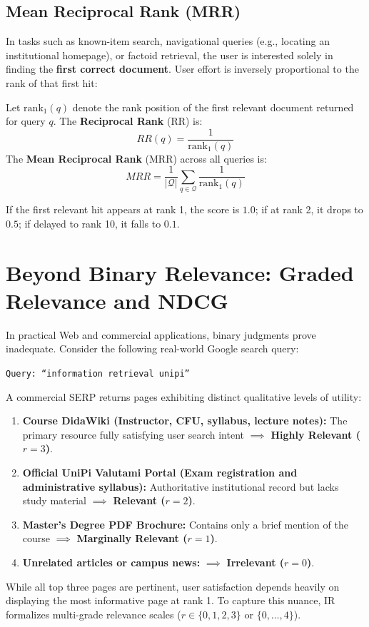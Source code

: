 \subsection{Mean Reciprocal Rank (MRR)}
In tasks such as known-item search, navigational queries (e.g., locating an institutional homepage), or factoid retrieval, the user is interested solely in finding the \textbf{first correct document}. User effort is inversely proportional to the rank of that first hit:

\begin{definition}
Let $\mathrm{rank}_1(q)$ denote the rank position of the first relevant document returned for query $q$. The \textbf{Reciprocal Rank} (RR) is:
\begin{equation}
RR(q) = \frac{1}{\mathrm{rank}_1(q)}
\end{equation}
The \textbf{Mean Reciprocal Rank} (MRR) across all queries is:
\begin{equation}
MRR = \frac{1}{|\mathcal{Q}|} \sum_{q \in \mathcal{Q}} \frac{1}{\mathrm{rank}_1(q)}
\end{equation}
\end{definition}
If the first relevant hit appears at rank 1, the score is $1.0$; if at rank 2, it drops to $0.5$; if delayed to rank 10, it falls to $0.1$.

\FloatBarrier
\section{Beyond Binary Relevance: Graded Relevance and NDCG}

In practical Web and commercial applications, binary judgments prove inadequate. Consider the following real-world Google search query:
\begin{center}
\texttt{Query: ``information retrieval unipi''}
\end{center}
A commercial SERP returns pages exhibiting distinct qualitative levels of utility:
\begin{enumerate}
    \item \textbf{Course DidaWiki (Instructor, CFU, syllabus, lecture notes):} The primary resource fully satisfying user search intent $\implies$ \textbf{Highly Relevant ($r = 3$)}.
    \item \textbf{Official UniPi Valutami Portal (Exam registration and administrative syllabus):} Authoritative institutional record but lacks study material $\implies$ \textbf{Relevant ($r = 2$)}.
    \item \textbf{Master's Degree PDF Brochure:} Contains only a brief mention of the course $\implies$ \textbf{Marginally Relevant ($r = 1$)}.
    \item \textbf{Unrelated articles or campus news:} $\implies$ \textbf{Irrelevant ($r = 0$)}.
\end{enumerate}
While all top three pages are pertinent, user satisfaction depends heavily on displaying the most informative page at rank 1. To capture this nuance, IR formalizes multi-grade relevance scales ($r \in \{0, 1, 2, 3\}$ or $\{0, \dots, 4\}$).

